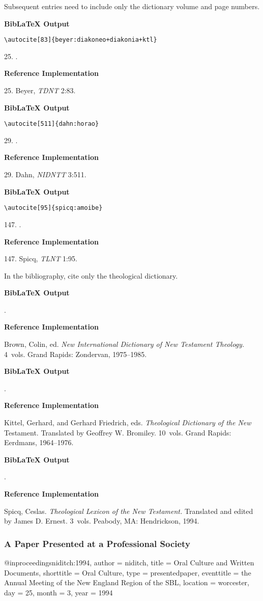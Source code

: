 \documentclass[a4paper]{article}
\newcommand\citetestlexns[3]{%
  {\textbf{BibLaTeX Output}\par
   \nobreak
   \texttt{\textbackslash autocite[#2]\{#3\}}\par
   \color{biblatex-colour}
   #1. \cite[#2]{#3}.\par}}
\newcommand\citetestbib[1]{%
  {\textbf{BibLaTeX Output}\par
   \nobreak
   \color{biblatex-colour}
   \hangindent\bibindent\bibentrycite{#1}.\par}}
\newenvironment{refimp}{%
  \begin{minipage}{\linewidth}
    \setlength{\parskip}{1ex}
    \textbf{Reference Implementation}\par
    \nobreak
    \color{reference-colour}
}{\end{minipage}}
\newenvironment{vb}{%
  \setlength{\parskip}{0pt}
  \verbatim}{\endverbatim}
\begin{document}
\bigskip

Subsequent entries need to include only the dictionary volume and page
numbers.

\citetestlexns{25}{83}{beyer:diakoneo+diakonia+ktl}

\begin{refimp}
  25. Beyer, \emph{TDNT} 2:83.
\end{refimp}

\citetestlexns{29}{511}{dahn:horao}

\begin{refimp}
  29. Dahn, \emph{NIDNTT} 3:511.
\end{refimp}

\citetestlexns{147}{95}{spicq:amoibe}

\begin{refimp}
  147. Spicq, \emph{TLNT} 1:95.
\end{refimp}

\bigskip

In the bibliography, cite only the theological dictionary.

\citetestbib{NIDNTT}

\begin{refimp}
  \hangindent\bibindent Brown, Colin, ed. \emph{New International Dictionary
  of New Testament Theology.} 4~vols. Grand Rapids: Zondervan, 1975–1985.
\end{refimp}

\citetestbib{TDNT}

\begin{refimp}
  \hangindent\bibindent Kittel, Gerhard, and Gerhard Friedrich, eds.
  \emph{Theological Dictionary of the New} Testament. Translated by Geoffrey
  W. Bromiley. 10~vols. Grand Rapids: Eerdmans, 1964–1976.
\end{refimp}

\citetestbib{TLNT}

\begin{refimp}
  \hangindent\bibindent Spicq, Ceslas. \emph{Theological Lexicon of the New
  Testament.} Translated and edited by James D. Ernest. 3~vols. Peabody, MA:
  Hendrickson, 1994.
\end{refimp}

\subsubsection{A Paper Presented at a Professional Society}

\begin{vb}
@inproceedings{niditch:1994,
  author = niditch,
  title = {Oral Culture and Written Documents},
  shorttitle = {Oral Culture},
  type = {presentedpaper},
  eventtitle = {the Annual Meeting of the New England Region
                of the SBL},
  location = worcester,
  day = {25},
  month = {3},
  year = {1994}
}
\end{vb}
\end{document}
